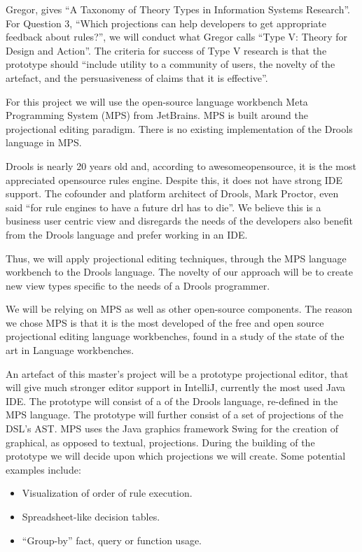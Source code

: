 Gregor\cite{gregor2006nature}, gives ``A Taxonomy of Theory Types in Information Systems Research''. 
For Question 3, ``Which projections can help developers to get appropriate feedback about rules?'', we will conduct what Gregor calls ``Type V: Theory for Design and Action''. 
The criteria for success of Type V research is that the prototype should ``include utility to a community of users, the novelty of the artefact, and the persuasiveness of claims that it is effective''.

For this project we will use the open-source language workbench Meta Programming System (MPS) from JetBrains\cite{MPS_ProductPage}.
MPS is built around the projectional editing paradigm.
There is no existing implementation of the Drools language in MPS.

Drools is nearly 20 years old and, according to awesomeopensource\cite{awesomeopensource}, it is the most appreciated opensource rules engine.
Despite this, it does not have strong IDE support.
The cofounder and platform architect of Drools, Mark Proctor, even said ``for rule engines to have a future drl has to die''\cite{Proctor_happenings}.
We believe this is a business user centric view and disregards the needs of the developers also benefit from the Drools language and prefer working in an IDE.

Thus, we will apply projectional editing techniques, through the MPS language workbench to the Drools language.
The novelty of our approach will be to create new view types specific to the needs of a Drools programmer.

We will be relying on MPS as well as other open-source components.
The reason we chose MPS is that it is the most developed of the free and open source projectional editing language workbenches, found in a study of the state of the art in Language workbenches\cite{erdweg2013state}.

An artefact of this master's project will be a prototype projectional editor, that will give much stronger editor support in IntelliJ, currently the most used Java IDE\cite{Java_usage_report}.
The prototype will consist of a of the Drools language, re-defined in the MPS language.  
The prototype will further consist of a set of projections of the DSL's AST.
MPS uses the Java graphics framework Swing for the creation of graphical, as opposed to textual, projections.
During the building of the prototype we will decide upon which projections we will create. 
Some potential examples include:
\begin{itemize}
    \item Visualization of order of rule execution.
    \item Spreadsheet-like decision tables.
    \item ``Group-by'' fact, query or function usage.
\end{itemize}

